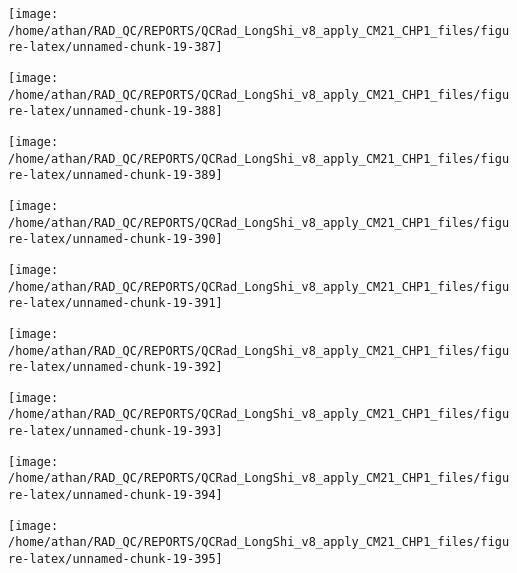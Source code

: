 \documentclass[
  10pt,
  a4paper,oneside]{article}
\begin{document}
\begin{center}\texttt{[image: /home/athan/RAD\_QC/REPORTS/QCRad\_LongShi\_v8\_apply\_CM21\_CHP1\_files/figure-latex/unnamed-chunk-19-387]} \end{center}

\begin{center}\texttt{[image: /home/athan/RAD\_QC/REPORTS/QCRad\_LongShi\_v8\_apply\_CM21\_CHP1\_files/figure-latex/unnamed-chunk-19-388]} \end{center}

\begin{center}\texttt{[image: /home/athan/RAD\_QC/REPORTS/QCRad\_LongShi\_v8\_apply\_CM21\_CHP1\_files/figure-latex/unnamed-chunk-19-389]} \end{center}

\begin{center}\texttt{[image: /home/athan/RAD\_QC/REPORTS/QCRad\_LongShi\_v8\_apply\_CM21\_CHP1\_files/figure-latex/unnamed-chunk-19-390]} \end{center}

\begin{center}\texttt{[image: /home/athan/RAD\_QC/REPORTS/QCRad\_LongShi\_v8\_apply\_CM21\_CHP1\_files/figure-latex/unnamed-chunk-19-391]} \end{center}

\begin{center}\texttt{[image: /home/athan/RAD\_QC/REPORTS/QCRad\_LongShi\_v8\_apply\_CM21\_CHP1\_files/figure-latex/unnamed-chunk-19-392]} \end{center}

\begin{center}\texttt{[image: /home/athan/RAD\_QC/REPORTS/QCRad\_LongShi\_v8\_apply\_CM21\_CHP1\_files/figure-latex/unnamed-chunk-19-393]} \end{center}

\begin{center}\texttt{[image: /home/athan/RAD\_QC/REPORTS/QCRad\_LongShi\_v8\_apply\_CM21\_CHP1\_files/figure-latex/unnamed-chunk-19-394]} \end{center}

\begin{center}\texttt{[image: /home/athan/RAD\_QC/REPORTS/QCRad\_LongShi\_v8\_apply\_CM21\_CHP1\_files/figure-latex/unnamed-chunk-19-395]} \end{center}
\end{document}
